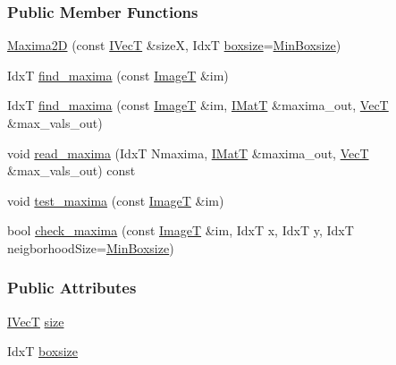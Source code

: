\subsubsection*{Public Member Functions}
\begin{DoxyCompactItemize}
\item 
\hyperlink{classboxxer_1_1Maxima2D_a937ece83a554f957dac931979c58705f}{Maxima2D} (const \hyperlink{classboxxer_1_1Maxima2D_a7396e4c9e917dfca02a7763e9f14bd41}{I\+VecT} \&sizeX, IdxT \hyperlink{classboxxer_1_1Maxima2D_a87d14d6b0d19746a0636204cba3cabfe}{boxsize}=\hyperlink{classboxxer_1_1Maxima2D_ab72858470871c7d5a90ed33839d7f220}{Min\+Boxsize})
\item 
IdxT \hyperlink{classboxxer_1_1Maxima2D_a4fb8ca11caaa1ef72b41673fd32b4db2}{find\+\_\+maxima} (const \hyperlink{classboxxer_1_1Maxima2D_ac6ececb6be39bc2fb15904134da4dafb}{ImageT} \&im)
\item 
IdxT \hyperlink{classboxxer_1_1Maxima2D_adf84d7e78fe730b3f63987af0108a4c0}{find\+\_\+maxima} (const \hyperlink{classboxxer_1_1Maxima2D_ac6ececb6be39bc2fb15904134da4dafb}{ImageT} \&im, \hyperlink{classboxxer_1_1Maxima2D_a8b90b97357c1bdf671e833446e15903b}{I\+MatT} \&maxima\+\_\+out, \hyperlink{classboxxer_1_1Maxima2D_a23c658a4a2d6f05fd405d6cdd4f8070b}{VecT} \&max\+\_\+vals\+\_\+out)
\item 
void \hyperlink{classboxxer_1_1Maxima2D_ac82a58870df8e7ecc1d52f3f4c1bcce1}{read\+\_\+maxima} (IdxT Nmaxima, \hyperlink{classboxxer_1_1Maxima2D_a8b90b97357c1bdf671e833446e15903b}{I\+MatT} \&maxima\+\_\+out, \hyperlink{classboxxer_1_1Maxima2D_a23c658a4a2d6f05fd405d6cdd4f8070b}{VecT} \&max\+\_\+vals\+\_\+out) const 
\item 
void \hyperlink{classboxxer_1_1Maxima2D_a8ec041cd0248571b56015712f4cf6196}{test\+\_\+maxima} (const \hyperlink{classboxxer_1_1Maxima2D_ac6ececb6be39bc2fb15904134da4dafb}{ImageT} \&im)
\item 
bool \hyperlink{classboxxer_1_1Maxima2D_a1a939a9c49eb457a0136ad572c1dce50}{check\+\_\+maxima} (const \hyperlink{classboxxer_1_1Maxima2D_ac6ececb6be39bc2fb15904134da4dafb}{ImageT} \&im, IdxT x, IdxT y, IdxT neigborhood\+Size=\hyperlink{classboxxer_1_1Maxima2D_ab72858470871c7d5a90ed33839d7f220}{Min\+Boxsize})
\end{DoxyCompactItemize}
\subsubsection*{Public Attributes}
\begin{DoxyCompactItemize}
\item 
\hyperlink{classboxxer_1_1Maxima2D_a7396e4c9e917dfca02a7763e9f14bd41}{I\+VecT} \hyperlink{classboxxer_1_1Maxima2D_aa05d0c7a4c0e6ed2b2b918986d53d069}{size}
\item 
IdxT \hyperlink{classboxxer_1_1Maxima2D_a87d14d6b0d19746a0636204cba3cabfe}{boxsize}
\end{DoxyCompactItemize}
